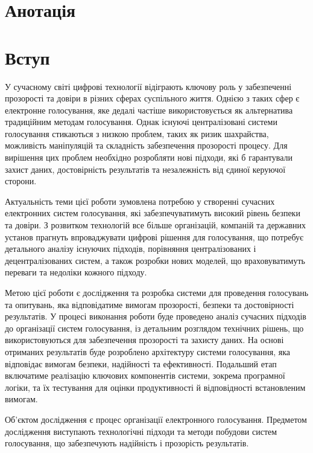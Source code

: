 \documentclass[14pt]{extreport}
\begin{document}
  \chapter*{Анотація}
  
  \tableofcontents
  \newpage
  
  \chapter*{Вступ}
  
  У сучасному світі цифрові технології відіграють ключову роль у забезпеченні прозорості та довіри в різних сферах суспільного життя. Однією з таких сфер є електронне голосування, яке дедалі частіше використовується як альтернатива традиційним методам голосування. Однак існуючі централізовані системи голосування стикаються з низкою проблем, таких як ризик шахрайства, можливість маніпуляцій та складність забезпечення прозорості процесу. Для вирішення цих проблем необхідно розробляти нові підходи, які б гарантували захист даних, достовірність результатів та незалежність від єдиної керуючої сторони.

  Актуальність теми цієї роботи зумовлена потребою у створенні сучасних електронних систем голосування, які забезпечуватимуть високий рівень безпеки та довіри. З розвитком технологій все більше організацій, компаній та державних установ прагнуть впроваджувати цифрові рішення для голосування, що потребує детального аналізу існуючих підходів, порівняння централізованих і децентралізованих систем, а також розробки нових моделей, що враховуватимуть переваги та недоліки кожного підходу.

  Метою цієї роботи є дослідження та розробка системи для проведення голосувань та опитувань, яка відповідатиме вимогам прозорості, безпеки та достовірності результатів. У процесі виконання роботи буде проведено аналіз сучасних підходів до організації систем голосування, із детальним розглядом технічних рішень, що використовуються для забезпечення прозорості та захисту даних. На основі отриманих результатів буде розроблено архітектуру системи голосування, яка відповідає вимогам безпеки, надійності та ефективності. Подальший етап включатиме реалізацію ключових компонентів системи, зокрема програмної логіки, та їх тестування для оцінки продуктивності й відповідності встановленим вимогам.

  Об’єктом дослідження є процес організації електронного голосування. Предметом дослідження виступають технологічні підходи та методи побудови систем голосування, що забезпечують надійність і прозорість результатів.
\end{document}
